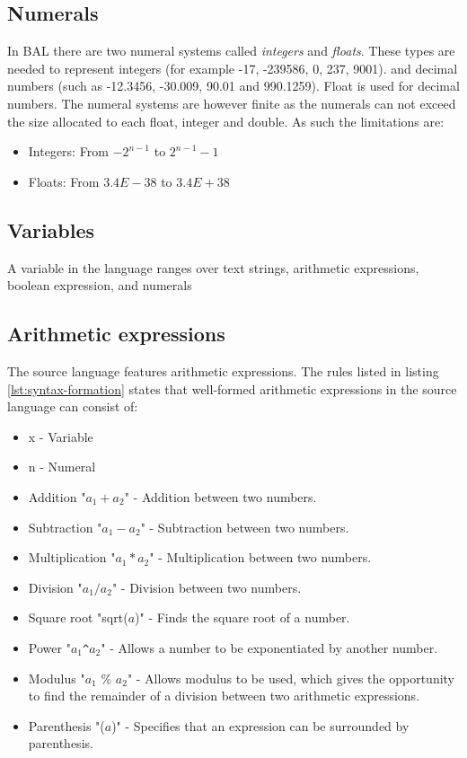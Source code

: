 \subsection{Numerals}
In BAL there are two numeral systems called \textit{integers} and \textit{floats}. These types are needed to represent integers (for example -17, -239586, 0, 237, 9001). and decimal numbers (such as -12.3456, -30.009, 90.01 and 990.1259). Float is used for decimal numbers. The numeral systems are however finite as the numerals can not exceed the size allocated to each float, integer and double. As such the limitations are:
\begin{itemize}
\item Integers: From $-2^{n-1}$ to $2^{n-1}-1$
\item Floats: From $3.4E-38$ to $3.4E+38$
\end{itemize}

\subsection{Variables}
A variable in the language ranges over text strings, arithmetic expressions, boolean expression, and numerals


\subsection{Arithmetic expressions}
The source language features arithmetic expressions. The rules listed in listing \ref{lst:syntax-formation} states that well-formed arithmetic expressions in the source language can consist of:
\begin{itemize}
	\item x - Variable
	\item n - Numeral
	\item Addition "$a_1 + a_2$" - Addition between two numbers.
	\item Subtraction "$a_1 - a_2$" - Subtraction between two numbers.
	\item Multiplication "$a_1 * a_2$" - Multiplication between two numbers.
	\item Division "$a_1 / a_2$" - Division between two numbers.
	\item Square root "sqrt($a$)" - Finds the square root of a number.
	\item Power "$a_1$\texttt{\^{}}$a_2$" - Allows a number to be exponentiated by another number.
	\item Modulus "$a_1$ \% $a_2$" - Allows modulus to be used, which gives the opportunity to find the remainder of a division between two arithmetic expressions.
	\item Parenthesis "($a$)" - Specifies that an expression can be surrounded by parenthesis.
\end{itemize}


